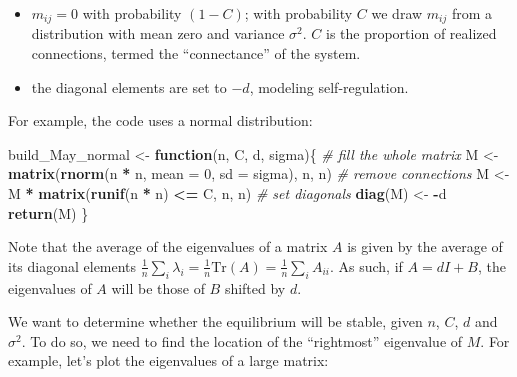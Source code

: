 \documentclass[
]{book}
\newenvironment{Shaded}{\begin{snugshade}}{\end{snugshade}}
\newcommand{\CommentTok}[1]{\textcolor[rgb]{0.56,0.35,0.01}{\textit{#1}}}
\newcommand{\ControlFlowTok}[1]{\textcolor[rgb]{0.13,0.29,0.53}{\textbf{#1}}}
\newcommand{\DataTypeTok}[1]{\textcolor[rgb]{0.13,0.29,0.53}{#1}}
\newcommand{\DecValTok}[1]{\textcolor[rgb]{0.00,0.00,0.81}{#1}}
\newcommand{\KeywordTok}[1]{\textcolor[rgb]{0.13,0.29,0.53}{\textbf{#1}}}
\newcommand{\NormalTok}[1]{#1}
\newcommand{\OperatorTok}[1]{\textcolor[rgb]{0.81,0.36,0.00}{\textbf{#1}}}
\newcommand{\StringTok}[1]{\textcolor[rgb]{0.31,0.60,0.02}{#1}}
\providecommand{\tightlist}{%
  \setlength{\itemsep}{0pt}\setlength{\parskip}{0pt}}
\begin{document}
\begin{itemize}
\tightlist
\item
  \(m_{ij} = 0\) with probability \((1-C)\); with probability \(C\) we draw \(m_{ij}\) from a distribution with mean zero and variance \(\sigma^2\). \(C\) is the proportion of realized connections, termed the ``connectance'' of the system.
\item
  the diagonal elements are set to \(-d\), modeling self-regulation.
\end{itemize}

For example, the code uses a normal distribution:

\begin{Shaded}
\begin{Highlighting}[]
\NormalTok{build_May_normal <-}\StringTok{ }\ControlFlowTok{function}\NormalTok{(n, C, d, sigma)\{}
  \CommentTok{# fill the whole matrix}
\NormalTok{  M <-}\StringTok{ }\KeywordTok{matrix}\NormalTok{(}\KeywordTok{rnorm}\NormalTok{(n }\OperatorTok{*}\StringTok{ }\NormalTok{n, }\DataTypeTok{mean =} \DecValTok{0}\NormalTok{, }\DataTypeTok{sd =}\NormalTok{ sigma), n, n)}
  \CommentTok{# remove connections }
\NormalTok{  M <-}\StringTok{ }\NormalTok{M }\OperatorTok{*}\StringTok{ }\KeywordTok{matrix}\NormalTok{(}\KeywordTok{runif}\NormalTok{(n }\OperatorTok{*}\StringTok{ }\NormalTok{n) }\OperatorTok{<=}\StringTok{ }\NormalTok{C, n, n)}
  \CommentTok{# set diagonals}
  \KeywordTok{diag}\NormalTok{(M) <-}\StringTok{ }\OperatorTok{-}\NormalTok{d}
  \KeywordTok{return}\NormalTok{(M)}
\NormalTok{\}}
\end{Highlighting}
\end{Shaded}

Note that the average of the eigenvalues of a matrix \(A\) is given by the average of its diagonal elements \(\frac{1}{n}\sum_i \lambda_i = \frac{1}{n} \text{Tr}(A) = \frac{1}{n} \sum_i A_{ii}\). As such, if \(A = dI + B\), the eigenvalues of \(A\) will be those of \(B\) shifted by \(d\).

We want to determine whether the equilibrium will be stable, given \(n\), \(C\), \(d\) and \(\sigma^2\). To do so, we need to find the location of the ``rightmost'' eigenvalue of \(M\). For example, let's plot the eigenvalues of a large matrix:
\end{document}
